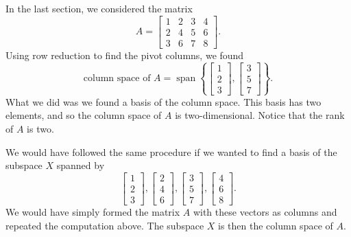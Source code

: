 \begin{example}
In the last section, we considered the matrix
\begin{equation*}
A =
\begin{bmatrix}
1 & 2 & 3 & 4 \\
2 & 4 & 5 & 6 \\
3 & 6 & 7 & 8
\end{bmatrix} .
\end{equation*}
Using row reduction to find the pivot columns, we found
\begin{equation*}
\text{column space of $A$}
=
\operatorname{span}
\left\{
\begin{bmatrix}
1 \\
2 \\
3
\end{bmatrix}
,
\begin{bmatrix}
3 \\
5 \\
7
\end{bmatrix}
\right\} .
\end{equation*}
What we did was we found a basis of the column space.
This basis has two elements, and so the column space of $A$ is two-dimensional.
Notice that the rank of $A$ is two.
\end{example}

We would have followed the same procedure if we wanted to find a basis of
the subspace $X$ spanned by
\begin{equation*}
\begin{bmatrix}
1 \\
2 \\
3
\end{bmatrix}
,
\begin{bmatrix}
2 \\
4 \\
6
\end{bmatrix}
,
\begin{bmatrix}
3 \\
5 \\
7
\end{bmatrix}
,
\begin{bmatrix}
4 \\
6 \\
8
\end{bmatrix}
.
\end{equation*}
We would have simply formed the matrix $A$ with these vectors as columns
and repeated the computation above.  The subspace $X$ is then the column space of
$A$.

